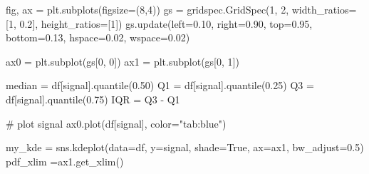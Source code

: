 \documentclass[
  letterpaper,
  DIV=11,
  numbers=noendperiod,
  oneside]{scrreprt}
\newenvironment{Shaded}{\begin{snugshade}}{\end{snugshade}}
\newcommand{\CommentTok}[1]{\textcolor[rgb]{0.37,0.37,0.37}{#1}}
\newcommand{\DecValTok}[1]{\textcolor[rgb]{0.68,0.00,0.00}{#1}}
\newcommand{\FloatTok}[1]{\textcolor[rgb]{0.68,0.00,0.00}{#1}}
\newcommand{\NormalTok}[1]{\textcolor[rgb]{0.00,0.23,0.31}{#1}}
\newcommand{\OperatorTok}[1]{\textcolor[rgb]{0.37,0.37,0.37}{#1}}
\newcommand{\StringTok}[1]{\textcolor[rgb]{0.13,0.47,0.30}{#1}}
\newcommand{\VariableTok}[1]{\textcolor[rgb]{0.07,0.07,0.07}{#1}}
\begin{document}
\begin{Shaded}
\begin{Highlighting}[]
\NormalTok{fig, ax }\OperatorTok{=}\NormalTok{ plt.subplots(figsize}\OperatorTok{=}\NormalTok{(}\DecValTok{8}\NormalTok{,}\DecValTok{4}\NormalTok{))}
\NormalTok{gs }\OperatorTok{=}\NormalTok{ gridspec.GridSpec(}\DecValTok{1}\NormalTok{, }\DecValTok{2}\NormalTok{, width\_ratios}\OperatorTok{=}\NormalTok{[}\DecValTok{1}\NormalTok{, }\FloatTok{0.2}\NormalTok{], height\_ratios}\OperatorTok{=}\NormalTok{[}\DecValTok{1}\NormalTok{])}
\NormalTok{gs.update(left}\OperatorTok{=}\FloatTok{0.10}\NormalTok{, right}\OperatorTok{=}\FloatTok{0.90}\NormalTok{, top}\OperatorTok{=}\FloatTok{0.95}\NormalTok{, bottom}\OperatorTok{=}\FloatTok{0.13}\NormalTok{,}
\NormalTok{          hspace}\OperatorTok{=}\FloatTok{0.02}\NormalTok{, wspace}\OperatorTok{=}\FloatTok{0.02}\NormalTok{)}

\NormalTok{ax0 }\OperatorTok{=}\NormalTok{ plt.subplot(gs[}\DecValTok{0}\NormalTok{, }\DecValTok{0}\NormalTok{])}
\NormalTok{ax1 }\OperatorTok{=}\NormalTok{ plt.subplot(gs[}\DecValTok{0}\NormalTok{, }\DecValTok{1}\NormalTok{])}

\NormalTok{median }\OperatorTok{=}\NormalTok{ df[}\StringTok{\textquotesingle{}signal\textquotesingle{}}\NormalTok{].quantile(}\FloatTok{0.50}\NormalTok{)}
\NormalTok{Q1 }\OperatorTok{=}\NormalTok{ df[}\StringTok{\textquotesingle{}signal\textquotesingle{}}\NormalTok{].quantile(}\FloatTok{0.25}\NormalTok{)}
\NormalTok{Q3 }\OperatorTok{=}\NormalTok{ df[}\StringTok{\textquotesingle{}signal\textquotesingle{}}\NormalTok{].quantile(}\FloatTok{0.75}\NormalTok{)}
\NormalTok{IQR }\OperatorTok{=}\NormalTok{ Q3 }\OperatorTok{{-}}\NormalTok{ Q1}

\CommentTok{\# plot signal}
\NormalTok{ax0.plot(df[}\StringTok{\textquotesingle{}signal\textquotesingle{}}\NormalTok{], color}\OperatorTok{=}\StringTok{"tab:blue"}\NormalTok{)}

\NormalTok{my\_kde }\OperatorTok{=}\NormalTok{ sns.kdeplot(data}\OperatorTok{=}\NormalTok{df, y}\OperatorTok{=}\StringTok{\textquotesingle{}signal\textquotesingle{}}\NormalTok{, shade}\OperatorTok{=}\VariableTok{True}\NormalTok{, ax}\OperatorTok{=}\NormalTok{ax1, bw\_adjust}\OperatorTok{=}\FloatTok{0.5}\NormalTok{)}
\NormalTok{pdf\_xlim }\OperatorTok{=}\NormalTok{ax1.get\_xlim()}


\end{Highlighting}
\end{Shaded}
\end{document}
